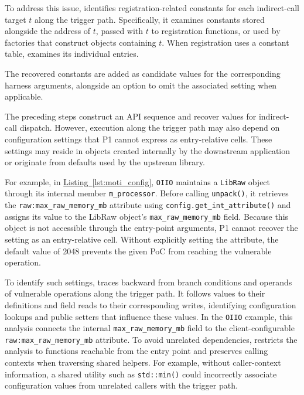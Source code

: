 To address this issue, \sys identifies registration-related constants for each indirect-call target $t$ along the trigger path.
Specifically, it examines constants stored alongside the address of $t$, passed with $t$ to registration functions, or used by factories that construct objects containing $t$.
When registration uses a constant table, \sys examines its individual entries.
%

The recovered constants are added as candidate values for the corresponding harness arguments, alongside an option to omit the associated setting when applicable.

The preceding steps construct an API sequence and recover values for indirect-call dispatch.
However, execution along the trigger path may also depend on configuration settings that P1 cannot express as entry-relative cells.
These settings may reside in objects created internally by the downstream application or originate from defaults used by the upstream library.

For example, in \hyperref[lst:moti_config]{Listing~\ref*{lst:moti_config}}, \texttt{OIIO} maintains a \texttt{LibRaw} object through its internal member \texttt{m\_processor}.
Before calling \texttt{unpack()}, it retrieves the \texttt{raw:max\_raw\_memory\_mb} attribute using \texttt{config.get\_int\_attribute()} and assigns its value to the LibRaw object's \texttt{max\_raw\_memory\_mb} field.
Because this object is not accessible through the entry-point arguments, P1 cannot recover the setting as an entry-relative cell.
Without explicitly setting the attribute, the default value of 2048 prevents the given PoC from reaching the vulnerable operation. 

To identify such settings, \sys traces backward from branch conditions and operands of vulnerable operations along the trigger path.
It follows values to their definitions and field reads to their corresponding writes, identifying configuration lookups and public setters that influence these values.
In the \texttt{OIIO} example, this analysis connects the internal \texttt{max\_raw\_memory\_mb} field to the client-configurable \texttt{raw:max\_raw\_memory\_mb} attribute.
To avoid unrelated dependencies, \sys restricts the analysis to functions reachable from the entry point and preserves calling contexts when traversing shared helpers.
For example, without caller-context information, a shared utility such as \texttt{std::min()} could incorrectly associate configuration values from unrelated callers with the trigger path.


